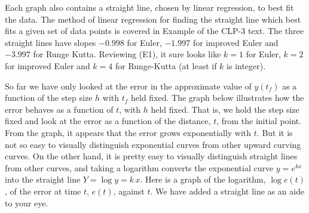 \noindent
Each graph also contains a straight line, chosen by linear regression, to best fit the data. The method of linear regression for finding the straight line which best fits a given set of data points is covered in 
Example  of the CLP-3 text.
The three straight lines have slopes $-0.998$ for Euler,
$-1.997$ for improved Euler and $-3.997$ for Runge Kutta. Reviewing (E1),
it sure looks like  $k=1$ for Euler, $k=2$ for 
improved Euler and $k=4$ for Runge-Kutta (at least if $k$ is integer).

So far we have only looked at the error in the approximate value of $y(t_f)$
as a function of the step size $h$ with $t_f$ held fixed. The graph below 
illustrates how the error behaves as a function of $t$, with $h$ held
fixed. That is, we hold the step size fixed and look at the error as a function of the distance, $t$, from the initial point. From the graph, it appears that the error grows exponentially with $t$. But it is not so easy to visually distinguish exponential curves from other upward 
curving curves. On the other hand, it is pretty easy to visually distinguish straight lines from other curves, and taking a logarithm converts 
the exponential curve $y=e^{kx}$ into  the straight line $Y=\log y = k\,x$.
Here is a graph of the logarithm, $\log e(t)$, of the error at time $t$, $e(t)$, against $t$. We have added a straight line as an aide to your eye.

